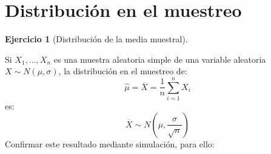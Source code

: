 \documentclass[
]{book}
\theoremstyle{break}
\theoremstyle{definition}
\theoremstyle{definition}
\theoremstyle{definition}
\newtheorem{exercise}{Ejercicio}[chapter]
\theoremstyle{definition}
\theoremstyle{remark}
\begin{document}
\hypertarget{distribuciuxf3n-en-el-muestreo}{%
\section{Distribución en el muestreo}\label{distribuciuxf3n-en-el-muestreo}}

\begin{exercise}[Distribución de la media muestral]
\protect\hypertarget{exr:distr-media}{}{\label{exr:distr-media} {} }
\end{exercise}

Si \(X_{1},\ldots,X_{n}\) es una muestra aleatoria simple de una
variable aleatoria \(X \sim N\left( \mu, \sigma \right)\), la
distribución en el muestreo de:
\[\hat{\mu}=\overline{X}=\dfrac{1}{n}\sum_{i=1}^{n}X_{i}\]
es:
\[\overline{X} \sim N\left(  \mu,\dfrac{\sigma}{\sqrt{n}}\right)\]
Confirmar este resultado mediante simulación, para ello:
\end{document}
